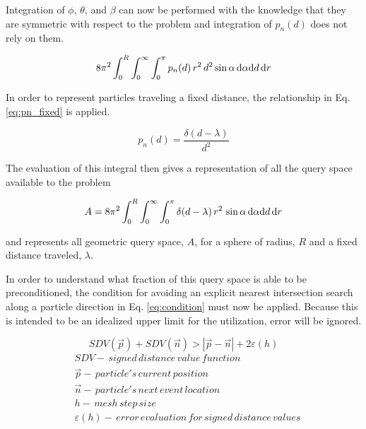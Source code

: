 Integration of $\phi$, $\theta$, and $\beta$ can now be performed with
the knowledge that they are symmetric with respect to the problem and
integration of $p_n(d)$ does not rely on them.

\begin{equation}
\small 8\pi^2  \int_{0}^{R}\int_{0}^{\infty}\int_{0}^{\pi} p_n(d) \,
r^2 \, d^2 \sin{\alpha} \, \mathrm{d}\alpha \mathrm{d}d \, \mathrm{d}r
\end{equation}

In order to represent particles traveling a fixed distance, the relationship in Eq. \ref{eq:pn_fixed}
is applied.

\begin{equation}
  \label{eq:pn_fixed}
  p_n(d) = \frac{\delta(d-\lambda)}{d^{2}}
\end{equation}

The evaluation of this integral then gives a representation of all the query
space available to the problem

\begin{equation}
  \label{eq:A_fixed}
\small A = 8\pi^2  \int_{0}^{R}\int_{0}^{\infty}\int_{0}^{\pi} \delta(d-\lambda) \,
r^2 \, \sin{\alpha} \, \mathrm{d}\alpha \mathrm{d}d \, \mathrm{d}r
\end{equation}

and represents all geometric query space, $A$, for a sphere of radius,
$R$ and a fixed distance traveled, $\lambda$.

In order to understand what fraction of this query space is able to be
preconditioned, the condition for avoiding an explicit nearest intersection
search along a particle direction in Eq. \ref{eq:condition} must now be
applied. Because this is intended to be an idealized upper limit for the
utilization, error will be ignored.

\begin{equation}
  SDV(\vec{p}) + SDV(\vec{n}) > |\vec{p}-\vec{n}| + 2\varepsilon(h)
  \label{eq:condition}
\end{equation}
\begin{align*}
 &SDV - \, signed \, distance \, value \, function \\
 &\vec{p} - \, particle's \, current \, position \\
 &\vec{n} - \, particle's \, next \, event \, location \\
 &h - \, mesh \, step \, size \\
 &\varepsilon(h) - \, error \, evaluation \, for \, signed \, distance \, values \\
\end{align*}

